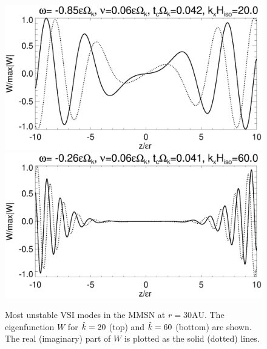 \begin{figure}
  \includegraphics[width=\linewidth,clip=true,trim=0cm 1.75cm 0cm 0cm]{figures/eigenvectorW_mmsnkx20.ps}
  \includegraphics[width=\linewidth,clip=true,trim=0cm 0cm 0cm 0cm]{figures/eigenvectorW_mmsnkx60.ps}
  \caption{Most unstable VSI modes in the MMSN at
    $r=30\mathrm{AU}$. The eigenfunction $W$ for $\hat{k}=20$ (top) and
    $\hat{k}=60$ (bottom) are shown. The real (imaginary) part of $W$
    is plotted as the solid (dotted) lines.\label{mmsn_eigenW}}  
\end{figure}

